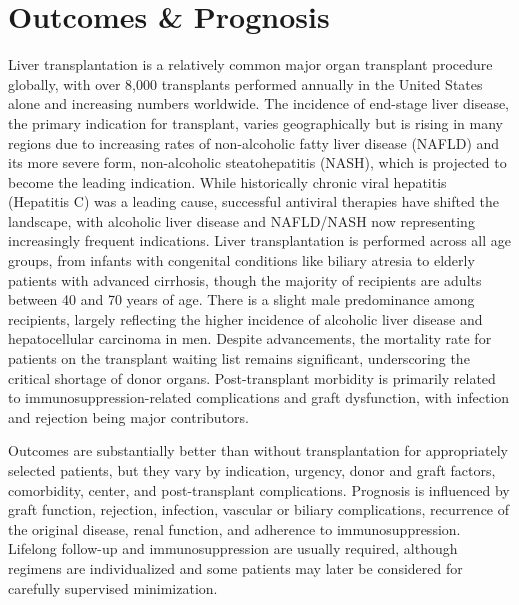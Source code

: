 \section*{Outcomes \& Prognosis}
Liver transplantation is a relatively common major organ transplant procedure globally, with over 8,000 transplants performed annually in the United States alone and increasing numbers worldwide. The incidence of end-stage liver disease, the primary indication for transplant, varies geographically but is rising in many regions due to increasing rates of non-alcoholic fatty liver disease (NAFLD) and its more severe form, non-alcoholic steatohepatitis (NASH), which is projected to become the leading indication. While historically chronic viral hepatitis (Hepatitis C) was a leading cause, successful antiviral therapies have shifted the landscape, with alcoholic liver disease and NAFLD/NASH now representing increasingly frequent indications. Liver transplantation is performed across all age groups, from infants with congenital conditions like biliary atresia to elderly patients with advanced cirrhosis, though the majority of recipients are adults between 40 and 70 years of age. There is a slight male predominance among recipients, largely reflecting the higher incidence of alcoholic liver disease and hepatocellular carcinoma in men. Despite advancements, the mortality rate for patients on the transplant waiting list remains significant, underscoring the critical shortage of donor organs. Post-transplant morbidity is primarily related to immunosuppression-related complications and graft dysfunction, with infection and rejection being major contributors.

Outcomes are substantially better than without transplantation for appropriately selected patients, but they vary by indication, urgency, donor and graft factors, comorbidity, center, and post-transplant complications. Prognosis is influenced by graft function, rejection, infection, vascular or biliary complications, recurrence of the original disease, renal function, and adherence to immunosuppression. Lifelong follow-up and immunosuppression are usually required, although regimens are individualized and some patients may later be considered for carefully supervised minimization.

